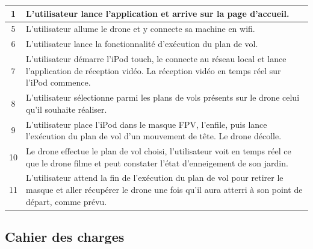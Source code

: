 \documentclass{article}
\begin{document}
	    \vspace{0.7cm}	     
	    \begin{center}
	    \renewcommand{\arraystretch}{2}
        \begin{tabularx}{15cm}{|c|X|}
            \hline
            1 & L'utilisateur lance l'application et arrive sur la page d'accueil.\\
            \hline
            5 & L'utilisateur allume le drone et y connecte sa machine en wifi. \\
            \hline
            6 & L'utilisateur lance la fonctionnalité d'exécution du plan de vol. \\
            \hline
            7 &  L'utilisateur démarre l'iPod touch, le connecte au réseau local et lance l'application de réception vidéo. La réception vidéo en temps réel sur l'iPod commence.\\
            \hline
            8 & L'utilisateur sélectionne parmi les plans de vols présents sur le drone celui qu'il souhaite réaliser. \\
            \hline
            9 & L'utilisateur place l'iPod dans le masque FPV, l'enfile, puis lance l'exécution du plan de vol d'un mouvement de tête. Le drone décolle. \\
            \hline
            10 & Le drone effectue le plan de vol choisi, l'utilisateur voit en temps réel ce que le drone filme et peut constater l'état d'enneigement de son jardin. \\
            \hline
            11 & L'utilisateur attend la fin de l'exécution du plan de vol pour retirer le masque et aller récupérer le drone une fois qu'il aura atterri à son point de départ, comme prévu.\\
            \hline 
\end{tabularx}
        \end{center}
	    




\newpage
\subsection{Cahier des charges}
\end{document}
